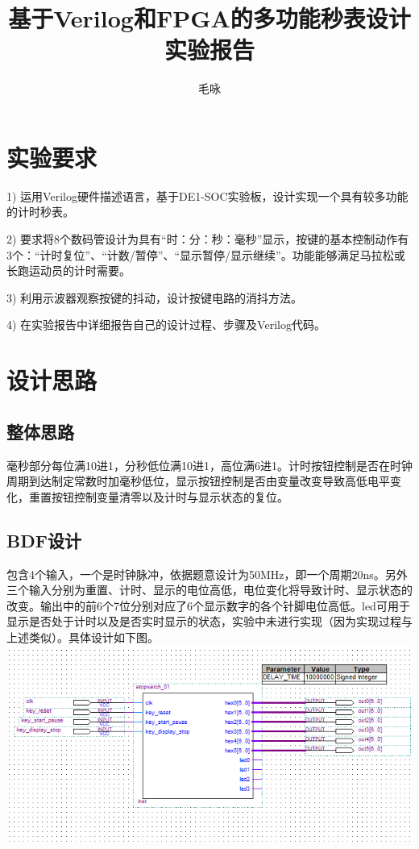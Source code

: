 \documentclass{article}
\author{毛咏}
\title{基于Verilog和FPGA的多功能秒表设计实验报告}
\begin{document}
	\maketitle
    \tableofcontents
    \newpage
    
    \section{实验要求}
    
    	\par 1) 运用Verilog硬件描述语言，基于DE1-SOC实验板，设计实现一个具有较多功能的计时秒表。
        \par 2) 要求将8个数码管设计为具有“时：分：秒：毫秒”显示，按键的基本控制动作有3个：“计时复位”、“计数/暂停”、“显示暂停/显示继续”。功能能够满足马拉松或长跑运动员的计时需要。
        \par 3) 利用示波器观察按键的抖动，设计按键电路的消抖方法。
        \par 4) 在实验报告中详细报告自己的设计过程、步骤及Verilog代码。
	
	\section{设计思路}
    
    	\subsection{整体思路}
        	\par 毫秒部分每位满10进1，分秒低位满10进1，高位满6进1。计时按钮控制是否在时钟周期到达制定常数时加毫秒低位，显示按钮控制是否由变量改变导致高低电平变化，重置按钮控制变量清零以及计时与显示状态的复位。
            
    	\subsection{BDF设计}
        	\par 包含4个输入，一个是时钟脉冲，依据题意设计为50MHz，即一个周期20ns。另外三个输入分别为重置、计时、显示的电位高低，电位变化将导致计时、显示状态的改变。输出中的前6个7位分别对应了6个显示数字的各个针脚电位高低。led可用于显示是否处于计时以及是否实时显示的状态，实验中未进行实现（因为实现过程与上述类似）。具体设计如下图。
            \newline
            \includegraphics[width=\textwidth]{bdf.png}
            
\end{document}
